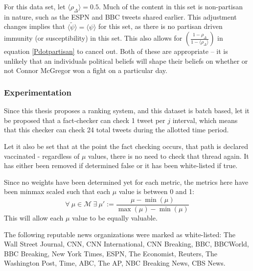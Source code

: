 \documentclass[preprint,review,12pt]{elsarticle}
\begin{document}
For this data set, let $\langle \rho_{\Delta} \rangle = 0.5$. Much of the content in this set is non-partisan in nature, such as the ESPN and BBC tweets shared earlier. This adjustment changes implies that $\langle \tilde{\psi} \rangle = \langle \psi \rangle$ for this set, as there is no partisan driven immunity (or susceptibility) in this set. This also allows for 
$\left(\frac{1-\rho_{\Delta}}{1-\langle\rho_{\Delta}\rangle}\right)$ in equation \ref{Pdotpartisan} to cancel out. Both of these are appropriate -- it is unlikely that an individuals political beliefs will shape their beliefs on whether or not Connor McGregor won a fight on a particular day. 

\subsubsection{Experimentation}
\label{sec: Twitter15 Experimentation}
Since this thesis proposes a ranking system, and this dataset is batch based, let it be proposed that a fact-checker can check 1 tweet per $j$ interval, which means that this checker can check 24 total tweets during the allotted time period.

Let it also be set that at the point the fact checking occurs, that path is declared vaccinated - regardless of $\mu$ values, there is no need to check that thread again. It has either been removed if determined false or it has been white-listed if true.

Since no weights have been determined yet for each metric, the metrics here have been minmax scaled such that each $\mu$ value is between 0 and 1: 
\[
\forall \ \mu \in \mathcal{M} \  \exists \ \mu' := \frac{\mu - \min(\mu)}{\max(\mu) - \min(\mu)} 
\]
This will allow each $\mu$ value to be equally valuable.

The following reputable news organizations were marked as white-listed: The Wall Street Journal, CNN, CNN International, CNN Breaking, BBC, BBCWorld, BBC Breaking, New York Times, ESPN, The Economist, Reuters, The Washington Post, Time, ABC, The AP, NBC Breaking News, CBS News.
\end{document}
